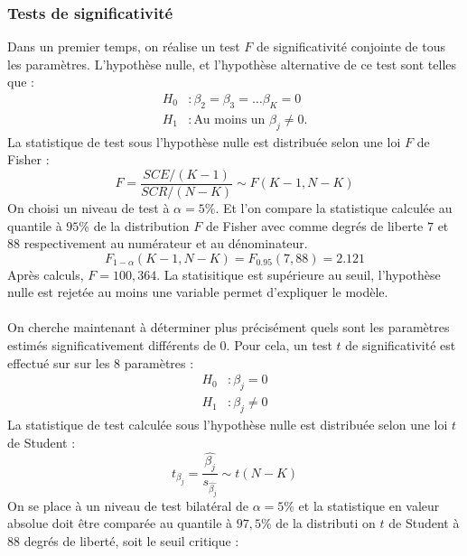 \documentclass[]{article}
\begin{document}
\subsubsection{Tests de significativité}
Dans un premier temps, on réalise un test $F$ de significativité conjointe de tous les paramètres. L'hypothèse nulle, et l'hypothèse alternative de ce test sont telles que :
\begin{equation*}
\begin{split}
    H_0 &: \beta_2 = \beta_3 = \dots \beta_K =0 \\
    H_1 &: \text{Au moins un }\beta_j \neq 0.
\end{split}
\end{equation*}
La statistique de test sous l'hypothèse nulle est distribuée selon une loi $F$ de Fisher :
\begin{equation*}
    F = \frac{SCE/(K-1)}{SCR/(N-K)} \sim F(K-1, N-K)
\end{equation*}
On choisi un niveau de test à $\alpha = 5\%$. Et l'on compare la statistique calculée au quantile à $95\%$ de la distribution $F$ de Fisher avec 
comme degrés de liberte $7$ et $88$ respectivement au numérateur et au dénominateur. 
\begin{equation*}
    F_{1-\alpha} (K-1, N-K) = F_{0.95}(7, 88) = 2.121
\end{equation*}
Après calculs, $F = 100,364$. La statisitique est supérieure au seuil, l'hypothèse nulle est rejetée au moins une variable permet d'expliquer le modèle.
\\ \\
On cherche maintenant à déterminer plus précisément quels sont les paramètres estimés significativement différents de 0. Pour cela, un test $t$ de 
significativité est effectué sur sur les $8$ paramètres :
\begin{equation*}
\begin{split}
    H_0 &: \beta_j =0 \\
    H_1 &: \beta_j \neq 0
\end{split}
\end{equation*}
La statistique de test calculée sous l'hypothèse nulle est distribuée selon une loi $t$ de Student : 
\begin{equation*}
    t_{\beta_j} = \frac{\hat{\beta_j}}{s_{\hat{\beta_j}}} \sim t(N-K)
\end{equation*}
On se place à un niveau de test bilatéral de $\alpha = 5\%$ et la statistique en valeur absolue doit être comparée au quantile à $97,5\%$ de la distributi
on $t$ de Student à $88$ degrés de liberté, soit le seuil critique :
\end{document}
